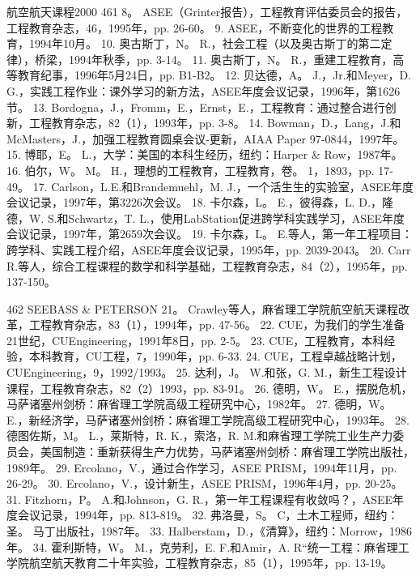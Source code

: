 \documentclass[UTF8,11pt,a4paper,openany,fontset=fandol]{ctexbook}
\begin{document}
航空航天课程2000 461 8。 ASEE（Grinter报告），工程教育评估委员会的报告，工程教育杂志，46，1995年，pp. 26-60。 9. ASEE，不断变化的世界的工程教育，1994年10月。 10. 奥古斯丁，N。 R.，社会工程（以及奥古斯丁的第二定律），桥梁，1994年秋季，pp. 3-14。 11. 奥古斯丁，N。 R.，重建工程教育，高等教育纪事，1996年5月24日，pp. B1-B2。 12. 贝达德，A。 J.，Jr.和Meyer，D. G.，实践工程作业：课外学习的新方法，ASEE年度会议记录，1996年，第1626节。 13. Bordogna，J.，Fromm，E.，Ernst，E.，工程教育：通过整合进行创新，工程教育杂志，82（1），1993年，pp. 3-8。 14. Bowman，D.，Lang，J.和McMasters，J.，加强工程教育圆桌会议-更新，AIAA Paper 97-0844，1997年。 15. 博耶，E。 L.，大学：美国的本科生经历，纽约：Harper \& Row，1987年。 16. 伯尔，W。 M。 H.，理想的工程教育，工程教育，卷。 1，1893，pp. 17-49。 17. Carlson，L.E.和Brandemuehl，M. J.，一个活生生的实验室，ASEE年度会议记录，1997年，第3226次会议。 18. 卡尔森，L。 E.，彼得森，L. D.，隆德，W. S.和Schwartz，T. L.，使用LabStation促进跨学科实践学习，ASEE年度会议记录，1997年，第2659次会议。 19. 卡尔森，L。 E.等人，第一年工程项目：跨学科、实践工程介绍，ASEE年度会议记录，1995年，pp. 2039-2043。 20. Carr R.等人，综合工程课程的数学和科学基础，工程教育杂志，84（2），1995年，pp. 137-150。

462 SEEBASS \& PETERSON 21。 Crawley等人，麻省理工学院航空航天课程改革，工程教育杂志，83（1），1994年，pp. 47-56。 22. CUE，为我们的学生准备21世纪，CUEngineering，1991年8日，pp. 2-5。 23. CUE，工程教育，本科经验，本科教育，CU工程，7，1990年，pp. 6-33. 24. CUE，工程卓越战略计划，CUEngineering，9，1992/1993。 25. 达利，J。 W.和张，G. M.，新生工程设计课程，工程教育杂志，82（2）1993，pp. 83-91。 26. 德明，W。 E.，摆脱危机，马萨诸塞州剑桥：麻省理工学院高级工程研究中心，1982年。 27. 德明，W。 E.，新经济学，马萨诸塞州剑桥：麻省理工学院高级工程研究中心，1993年。 28. 德图佐斯，M。 L.，莱斯特，R. K.，索洛，R. M.和麻省理工学院工业生产力委员会，美国制造：重新获得生产力优势，马萨诸塞州剑桥：麻省理工学院出版社，1989年。 29. Ercolano，V.，通过合作学习，ASEE PRISM，1994年11月，pp. 26-29。 30. Ercolano，V.，设计新生，ASEE PRISM，1996年4月，pp. 20-25。 31. Fitzhorn，P。 A.和Johnson，G. R.，第一年工程课程有收敛吗？，ASEE年度会议记录，1994年，pp. 813-819。 32. 弗洛曼，S。 C，土木工程师，纽约：圣。 马丁出版社，1987年。 33. Halberstam，D.，《清算》，纽约：Morrow，1986年。 34. 霍利斯特，W。 M.，克劳利，E. F.和Amir，A. R“统一工程：麻省理工学院航空航天教育二十年实验，工程教育杂志，85（1），1995年，pp. 13-19。
\end{document}
